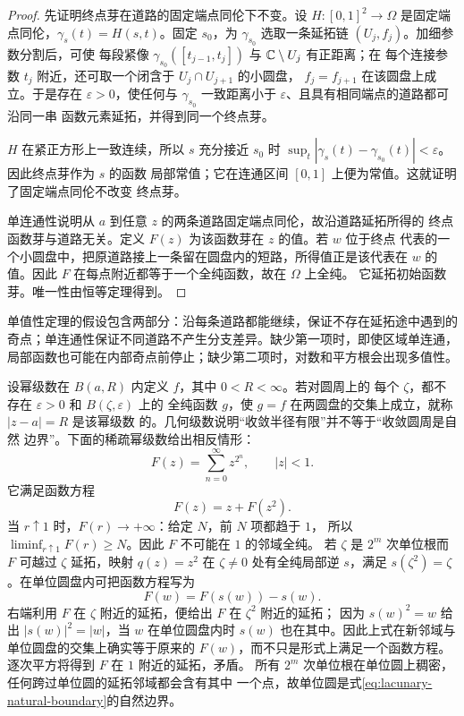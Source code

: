 \begin{proof}
先证明终点芽在道路的固定端点同伦下不变。设
$H:[0,1]^2\to\Omega$ 是固定端点同伦，$\gamma_s(t)=H(s,t)$。固定
$s_0$，为 $\gamma_{s_0}$ 选取一条延拓链 $(U_j,f_j)$。加细参数分割后，可使
每段紧像 $\gamma_{s_0}([t_{j-1},t_j])$ 与 $\mathbb{C}\setminus U_j$ 有正距离；在
每个连接参数 $t_j$ 附近，还可取一个闭含于 $U_j\cap U_{j+1}$ 的小圆盘，
$f_j=f_{j+1}$ 在该圆盘上成立。于是存在 $\varepsilon>0$，使任何与
$\gamma_{s_0}$ 一致距离小于 $\varepsilon$、且具有相同端点的道路都可沿同一串
函数元素延拓，并得到同一个终点芽。

$H$ 在紧正方形上一致连续，所以 $s$ 充分接近 $s_0$ 时
$\sup_t|\gamma_s(t)-\gamma_{s_0}(t)|<\varepsilon$。因此终点芽作为 $s$ 的函数
局部常值；它在连通区间 $[0,1]$ 上便为常值。这就证明了固定端点同伦不改变
终点芽。

单连通性说明从 $a$ 到任意 $z$ 的两条道路固定端点同伦，故沿道路延拓所得的
终点函数芽与道路无关。定义 $F(z)$ 为该函数芽在 $z$ 的值。若 $w$ 位于终点
代表的一个小圆盘中，把原道路接上一条留在圆盘内的短路，所得值正是该代表在
$w$ 的值。因此 $F$ 在每点附近都等于一个全纯函数，故在 $\Omega$ 上全纯。
它延拓初始函数芽。唯一性由恒等定理得到。
\end{proof}

单值性定理的假设包含两部分：沿每条道路都能继续，保证不存在延拓途中遇到的
奇点；单连通性保证不同道路不产生分支差异。缺少第一项时，即使区域单连通，
局部函数也可能在内部奇点前停止；缺少第二项时，对数和平方根会出现多值性。

设幂级数在 $B(a,R)$ 内定义 $f$，其中 $0<R<\infty$。若对圆周上的
每个 $\zeta$，都不存在 $\varepsilon>0$ 和 $B(\zeta,\varepsilon)$ 上的
全纯函数 $g$，使 $g=f$ 在两圆盘的交集上成立，就称 $|z-a|=R$ 是该幂级数
的。几何级数说明“收敛半径有限”并不等于“收敛圆周是自然
边界”。下面的稀疏幂级数给出相反情形：
\begin{equation}\label{eq:lacunary-natural-boundary}
 F(z)=\sum_{n=0}^{\infty}z^{2^n},\qquad |z|<1.
\end{equation}
它满足函数方程
\[
 F(z)=z+F(z^2).
\]
当 $r\uparrow1$ 时，$F(r)\to+\infty$：给定 $N$，前 $N$ 项都趋于 $1$，
所以 $\liminf_{r\uparrow1}F(r)\ge N$。因此 $F$ 不可能在 $1$ 的邻域全纯。
若 $\zeta$ 是 $2^m$ 次单位根而 $F$ 可越过 $\zeta$ 延拓，映射
$q(z)=z^2$ 在 $\zeta\ne0$ 处有全纯局部逆 $s$，满足
$s(\zeta^2)=\zeta$。在单位圆盘内可把函数方程写为
\[
 F(w)=F(s(w))-s(w).
\]
右端利用 $F$ 在 $\zeta$ 附近的延拓，便给出 $F$ 在 $\zeta^2$ 附近的延拓；
因为 $s(w)^2=w$ 给出 $|s(w)|^2=|w|$，当 $w$ 在单位圆盘内时
$s(w)$ 也在其中。因此上式在新邻域与单位圆盘的交集上确实等于原来的
$F(w)$，而不只是形式上满足一个函数方程。
逐次平方将得到 $F$ 在 $1$ 附近的延拓，矛盾。
所有 $2^m$ 次单位根在单位圆上稠密，任何跨过单位圆的延拓邻域都会含有其中
一个点，故单位圆是式\eqref{eq:lacunary-natural-boundary}的自然边界。

